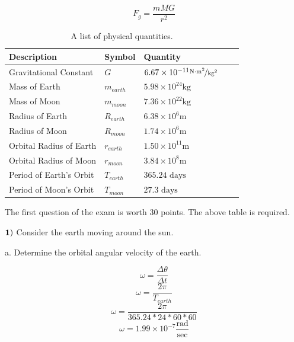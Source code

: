 \documentclass{article}
\begin{document}
   $$F_g=\frac{mMG}{r^2}$$
   \begin{table}[htbp]
\begin{center}
\footnotesize
\begin{tabular}{lllll}
\toprule
 Description              & Symbol          & Quantity                                                                \\
\midrule
  Gravitational Constant   & $G$             & $6.67 \times 10^{-11} \nicefrac{ \text{N}\cdot\text{m}^2}{\text{kg}^2}$ \\
    Mass of Earth   & $m_{earth}$           & $5.98\times 10^{24} \text{kg}$    \\
    Mass of Moon   & $m_{moon}$           & $7.36\times 10^{22} \text{kg}$    \\
    Radius of Earth     & $R_{earth}$           & $6.38 \times 10^{6} \text{m}$                   \\
     Radius of Moon    & $R_{moon}$           & $1.74 \times 10^{6} \text{m}$                   \\
     Orbital Radius of Earth    & $r_{earth}$           & $1.50 \times 10^{11} {\text{m}}$                   \\
     Orbital Radius of Moon    & $r_{moon}$           & $3.84 \times 10^{8} \text{m}$                   \\
      Period of Earth's Orbit     & $T_{earth}$ &   $365.24\text{ days}$                    \\
    Period of Moon's Orbit     & $T_{moon}$ &   $27.3\text{ days}$                    \\
                                     

\bottomrule
\end{tabular}
\end{center}
  \caption{A list of physical quantities.}
  \label{tab:font-sizes}
\end{table}

\newpage

The first question of the exam is worth 30 points.  The above table is required. 

 $\bf{1)}$ Consider the earth moving around the sun.
 
  \vspace{1cm}
 
 a.  Determine the orbital angular velocity of the earth.
 
 $$\omega=\frac{\Delta\theta}{\Delta t}$$
 $$\omega=\frac{2\pi}{T_{earth}}$$
 $$\omega=\frac{2\pi}{365.24*24*60*60}$$
 $$\omega=1.99 \times 10^{-7} \frac{\text{rad}}{\text{sec}}$$
 
\end{document}
